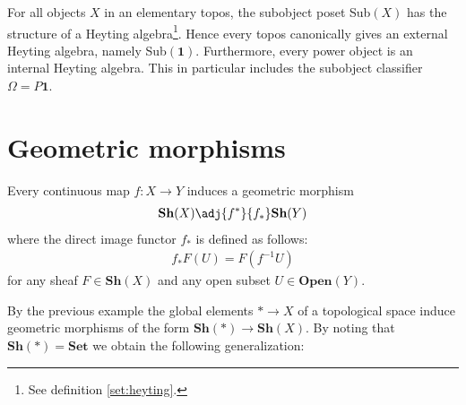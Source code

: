 	\begin{property}
		For all objects $X$ in an elementary topos, the subobject poset Sub$(X)$ has the structure of a Heyting algebra\footnote{See definition \ref{set:heyting}.}. Hence every topos canonically gives an external Heyting algebra, namely Sub$(\mathbf{1})$. Furthermore, every power object is an internal Heyting algebra. This in particular includes the subobject classifier $\Omega=P{\mathbf{1}}$.
	\end{property}

\section{Geometric morphisms}


	
	\begin{example}
		Every continuous map $f:X\rightarrow Y$ induces a geometric morphism
		\begin{gather}
			\textbf{Sh}(X)\adj{f^*}{f_*}\textbf{Sh}(Y)
		\end{gather}
		where the direct image functor $f_*$ is defined as follows:
		\begin{gather}
			f_*F(U) = F(f^{-1}U)
		\end{gather}
		for any sheaf $F\in\textbf{Sh}(X)$ and any open subset $U\in\textbf{Open}(Y)$.
	\end{example}
	
	By the previous example the global elements $\ast\rightarrow X$ of a topological space induce geometric morphisms of the form $\textbf{Sh}(\ast)\rightarrow\textbf{Sh}(X)$. By noting that $\textbf{Sh}(\ast)=\textbf{Set}$ we obtain the following generalization:
	
